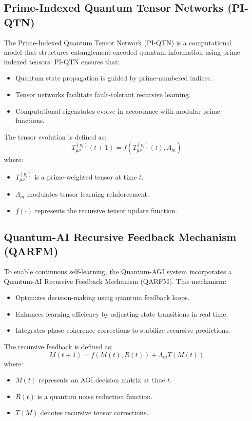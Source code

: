 \documentclass{article}
\theoremstyle{plain}
\begin{document}
\subsection{Prime-Indexed Quantum Tensor Networks (PI-QTN)}
The Prime-Indexed Quantum Tensor Network (PI-QTN) is a computational model that structures entanglement-encoded quantum information using prime-indexed tensors. PI-QTN ensures that:
\begin{itemize}
    \item Quantum state propagation is guided by prime-numbered indices.
    \item Tensor networks facilitate fault-tolerant recursive learning.
    \item Computational eigenstates evolve in accordance with modular prime functions.
\end{itemize}

The tensor evolution is defined as:
\begin{equation}
    T_{\mu\nu}^{(p_i)}(t+1) = f\left(T_{\mu\nu}^{(p_i)}(t), \Lambda_m \right)
\end{equation}
where:
\begin{itemize}
    \item $T_{\mu\nu}^{(p_i)}$ is a prime-weighted tensor at time $t$.
    \item $\Lambda_m$ modulates tensor learning reinforcement.
    \item $f(\cdot)$ represents the recursive tensor update function.
\end{itemize}

\subsection{Quantum-AI Recursive Feedback Mechanism (QARFM)}
To enable continuous self-learning, the Quantum-AGI system incorporates a Quantum-AI Recursive Feedback Mechanism (QARFM). This mechanism:
\begin{itemize}
    \item Optimizes decision-making using quantum feedback loops.
    \item Enhances learning efficiency by adjusting state transitions in real time.
    \item Integrates phase coherence corrections to stabilize recursive predictions.
\end{itemize}

The recursive feedback is defined as:
\begin{equation}
    M(t+1) = f\left( M(t), R(t) \right) + \Lambda_m T(M(t))
\end{equation}
where:
\begin{itemize}
    \item $M(t)$ represents an AGI decision matrix at time $t$.
    \item $R(t)$ is a quantum noise reduction function.
    \item $T(M)$ denotes recursive tensor corrections.
\end{itemize}
\end{document}
